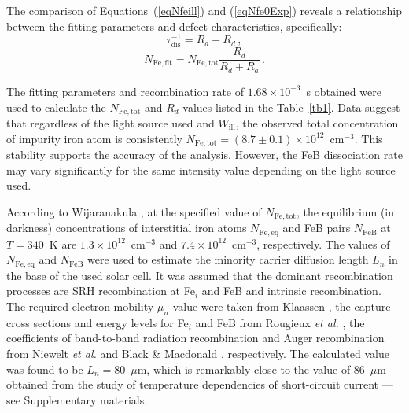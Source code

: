 \documentclass{WileyMSP-template}
\begin{document}
The comparison of Equations~(\ref{eqNfeill}) and (\ref{eqNfe0Exp}) reveals a relationship between
the fitting parameters and defect characteristics, specifically:
\begin{equation}
\label{eqTauRd}
\tau_\mathrm{dis}^{-1}=R_a+R_d\,,
\end{equation}
\begin{equation}
\label{eqFefit}
N_\mathrm{Fe,fit}=N_\mathrm{Fe,tot}\frac{R_d}{R_d+R_a}\,.
\end{equation}


The fitting parameters and recombination rate of  $1.68\times10^{-3}$~s obtained
were used to calculate the $N_\mathrm{Fe,tot}$ and $R_d$ values listed in the Table~\ref{tb1}.
Data suggest that regardless of the light source used and $W_\mathrm{ill}$,
the observed total concentration of impurity iron atom is consistently
$N_\mathrm{Fe,tot}=(8.7\pm0.1)\times10^{12}$~cm$^{-3}$.
This stability supports the accuracy of the analysis.
However, the FeB dissociation rate may vary significantly for the same intensity value depending on the light source used.

According to Wijaranakula \cite{FeB:kinetic}, at the specified value of $N_\mathrm{Fe,tot}$,
the equilibrium (in darkness) concentrations of interstitial iron atoms $N_\mathrm{Fe,eq}$ and FeB pairs
$N_\mathrm{FeB}$ at $T=340$~K are $1.3\times10^{12}$~cm$^{-3}$ and $7.4\times10^{12}$~cm$^{-3}$, respectively.
The values of $N_\mathrm{Fe,eq}$ and $N_\mathrm{FeB}$ were used to estimate the minority carrier diffusion length $L_n$
in the base of the used solar cell.
It was assumed that the dominant recombination processes are SRH recombination at Fe$_i$ and FeB and intrinsic recombination.
The required electron mobility $\mu_n$ value were taken from Klaassen \cite{KLAASSEN953},
the capture cross sections and energy levels for Fe$_i$ and FeB from Rougieux \emph{et al.} \cite{ROUGIEUX2018},
the coefficients of band-to-band radiation recombination and Auger recombination from
Niewelt \emph{et al.} \cite{Brad2022} and Black \& Macdonald \cite{AugerSi2022}, respectively.
The calculated value was found to be $L_n=80$~$\mu$m,
which is remarkably close to the value of 86~$\mu$m  obtained from the study of temperature dependencies of short-circuit current --- see Supplementary materials.
\end{document}
